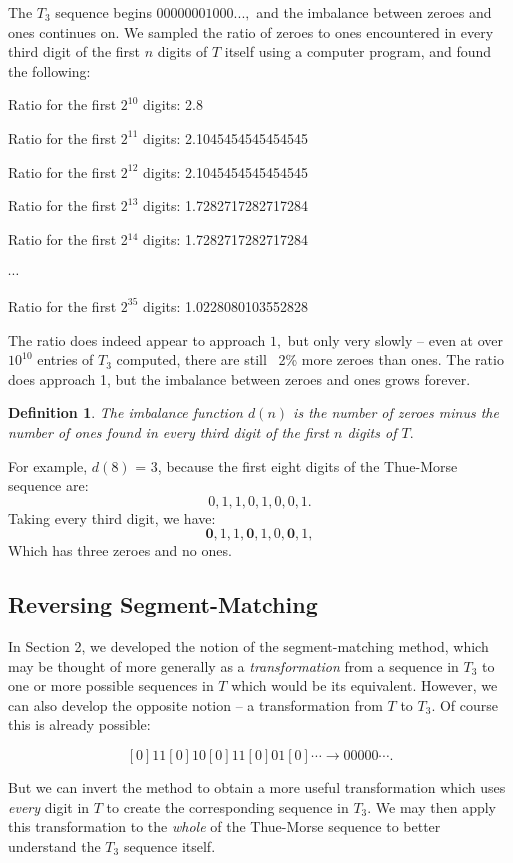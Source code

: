 \documentclass{article}
\newtheorem{definition}{Definition}[section]
\begin{document}
The $T_3$ sequence begins $00000001000...,$ and the imbalance between zeroes and ones continues on. We sampled the ratio of zeroes to ones encountered in every third digit of the first $n$ digits of $T$ itself using a computer program, and found the following:

Ratio for the first $2^{10}$ digits: 2.8

Ratio for the first $2^{11}$ digits: 2.1045454545454545

Ratio for the first $2^{12}$ digits: 2.1045454545454545

Ratio for the first $2^{13}$ digits: 1.7282717282717284

Ratio for the first 2$^{14}$ digits: 1.7282717282717284

$\cdots$

Ratio for the first $2^{35}$ digits: 1.0228080103552828

The ratio does indeed appear to approach $1,$ but only very slowly -- even at over $10^{10}$ entries of $T_3$ computed, there are still ~2\% more zeroes than ones. The ratio does approach 1, but the imbalance between zeroes and ones grows forever.

\begin{definition}
\label{imb}
The imbalance function $d(n)$ is the number of zeroes minus the number of ones found in every third digit of the first $n$ digits of $T.$
\end{definition}

For example, $d(8)$ = 3, because the first eight digits of the Thue-Morse sequence are:
$$0, 1, 1, 0, 1, 0, 0, 1.$$
Taking every third digit, we have:
$$\textbf{0}, 1, 1, \textbf{0}, 1, 0, \textbf{0}, 1,$$
Which has three zeroes and no ones.

\subsection{Reversing Segment-Matching}

In Section 2, we developed the notion of the segment-matching method, which may be thought of more generally as a \emph{transformation} from a sequence in $T_3$ to one or more possible sequences in $T$ which would be its equivalent. However, we can also develop the opposite notion -- a transformation from $T$ to $T_3.$ Of course this is already possible:

$$[0]11[0]10[0]11[0]01[0] \cdots \rightarrow 00000 \cdots .$$

But we can invert the method to obtain a more useful transformation which uses \emph{every} digit in $T$ to create the corresponding sequence in $T_3.$ We may then apply this transformation to the \emph{whole} of the Thue-Morse sequence to better understand the $T_3$ sequence itself.
\end{document}
